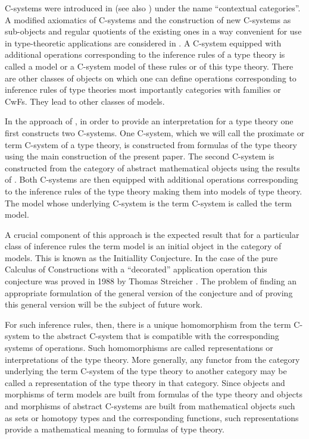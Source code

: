 \documentclass[12pt]{amsart}
\begin{document}
C-systems were introduced in \cite{Cartmell0} (see also \cite{Cartmell1}) under the name ``contextual categories''. A modified axiomatics of C-systems and the construction of new C-systems as sub-objects and regular quotients of the existing ones in a way convenient for use in type-theoretic applications are considered in \cite{Csubsystems}. A C-system equipped with additional operations corresponding to the inference rules of a type theory is called a model or a C-system model of these rules or of this type theory. There are other classes of objects on which one can define operations corresponding to inference rules of type theories most importantly categories with families or CwFs. They lead to other classes of models.  

In the approach of \cite{CMUtalk}, in order to provide an interpretation for a type theory one first constructs two C-systems. One C-system, which we will call the proximate or term C-system of a type theory, is constructed from formulas of the type theory using the main  construction of the present paper.  The second C-system is constructed from the category of abstract mathematical objects using the results of \cite{Cfromauniverse}. Both C-systems are then equipped with additional operations corresponding to the inference rules of the type theory making them into models of type theory.  The model whose underlying C-system is the term C-system is called the term model. 

A crucial component of this approach is the expected result that for a particular class of inference rules the term model is an initial object in the category of models. This is known as the Initiallity Conjecture. In the case of the pure Calculus of Constructions with a ``decorated''  application operation this conjecture was proved in 1988 by Thomas Streicher \cite{Streicher}. The problem of finding an appropriate formulation of the general version of the conjecture and of proving this general version will be the subject of future work. 

For such inference rules, then, there is a unique homomorphism from the term C-system to the abstract C-system that is compatible with the corresponding systems of operations. Such homomorphisms are called representations or interpretations of the type theory. More generally, any functor from the category underlying the term C-system of the type theory to another category may be called a representation of the type theory in that category. Since objects and morphisms of term models are built from formulas of the type theory and objects and morphisms of abstract C-systems are built from mathematical objects such as sets or homotopy types and the corresponding functions, such representations provide a mathematical meaning to formulas of type theory. 
\end{document}
